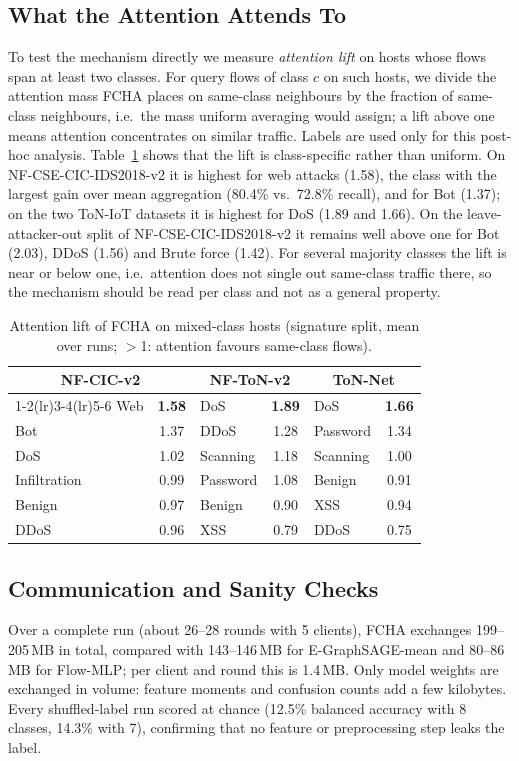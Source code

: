 \documentclass[journal]{IEEEtran}
\newcommand{\best}[1]{\textbf{#1}}
\begin{document}
\subsection{What the Attention Attends To}
To test the mechanism directly we measure \emph{attention lift} on hosts whose flows span at least two classes. For query flows of class $c$ on such hosts, we divide the attention mass FCHA places on same-class neighbours by the fraction of same-class neighbours, i.e.\ the mass uniform averaging would assign; a lift above one means attention concentrates on similar traffic. Labels are used only for this post-hoc analysis. Table~\ref{tab:lift} shows that the lift is class-specific rather than uniform. On NF-CSE-CIC-IDS2018-v2 it is highest for web attacks (1.58), the class with the largest gain over mean aggregation (80.4\% vs.\ 72.8\% recall), and for Bot (1.37); on the two ToN-IoT datasets it is highest for DoS (1.89 and 1.66). On the leave-attacker-out split of NF-CSE-CIC-IDS2018-v2 it remains well above one for Bot (2.03), DDoS (1.56) and Brute force (1.42). For several majority classes the lift is near or below one, i.e.\ attention does not single out same-class traffic there, so the mechanism should be read per class and not as a general property.

\begin{table}[t]
\centering
\caption{Attention lift of FCHA on mixed-class hosts (signature split, mean over runs; $>$1: attention favours same-class flows).}
\label{tab:lift}
\setlength{\tabcolsep}{3.5pt}
\footnotesize
\begin{tabular}{@{}lclclc@{}}
\toprule
\multicolumn{2}{c}{NF-CIC-v2} & \multicolumn{2}{c}{NF-ToN-v2} & \multicolumn{2}{c}{ToN-Net} \\
\cmidrule(lr){1-2}\cmidrule(lr){3-4}\cmidrule(lr){5-6}
Web & \best{1.58} & DoS & \best{1.89} & DoS & \best{1.66} \\
Bot & 1.37 & DDoS & 1.28 & Password & 1.34 \\
DoS & 1.02 & Scanning & 1.18 & Scanning & 1.00 \\
Infiltration & 0.99 & Password & 1.08 & Benign & 0.91 \\
Benign & 0.97 & Benign & 0.90 & XSS & 0.94 \\
DDoS & 0.96 & XSS & 0.79 & DDoS & 0.75 \\
\bottomrule
\end{tabular}
\end{table}

\subsection{Communication and Sanity Checks}
Over a complete run (about 26--28 rounds with 5 clients), FCHA exchanges 199--205\,MB in total, compared with 143--146\,MB for E-GraphSAGE-mean and 80--86\,MB for Flow-MLP; per client and round this is 1.4\,MB. Only model weights are exchanged in volume: feature moments and confusion counts add a few kilobytes. Every shuffled-label run scored at chance (12.5\% balanced accuracy with 8 classes, 14.3\% with 7), confirming that no feature or preprocessing step leaks the label.
\end{document}
